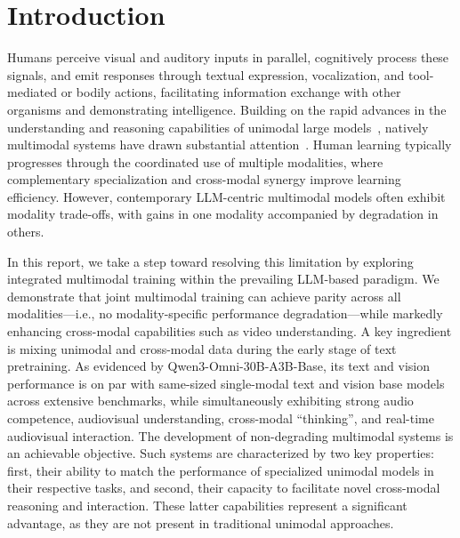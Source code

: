\section{Introduction}
\label{sec:intro}

Humans perceive visual and auditory inputs in parallel, cognitively process these signals, and emit responses through textual expression, vocalization, and tool-mediated or bodily actions, facilitating information exchange with other organisms and demonstrating intelligence. Building on the rapid advances in the understanding and reasoning capabilities of unimodal large models~\citep{gpt3,gpt4,gemini,claude,claude2,claude3,qwen,qwen2,qwen3,llama2,llama3,blip2,llava,minigpt-4,qwenvl,qwen2.5vl, qwenaudio, qwen2-audio}, natively multimodal systems have drawn substantial attention~\citep{gpt4o,gemini2.5,qwen2.5omni}. Human learning typically progresses through the coordinated use of multiple modalities, where complementary specialization and cross-modal synergy improve learning efficiency. However, contemporary LLM-centric multimodal models often exhibit modality trade-offs, with gains in one modality accompanied by degradation in others.


In this report, we take a step toward resolving this limitation by exploring integrated multimodal training within the prevailing LLM-based paradigm. We demonstrate that joint multimodal training can achieve parity across all modalities—i.e., no modality-specific performance degradation—while markedly enhancing cross-modal capabilities such as video understanding. A key ingredient is mixing unimodal and cross-modal data during the early stage of text pretraining. As evidenced by Qwen3-Omni-30B-A3B-Base, its text and vision performance is on par with same-sized single-modal text and vision base models across extensive benchmarks, while simultaneously exhibiting strong audio competence, audiovisual understanding, cross-modal ``thinking'', and real-time audiovisual interaction. The development of non-degrading multimodal systems is an achievable objective. Such systems are characterized by two key properties: first, their ability to match the performance of specialized unimodal models in their respective tasks, and second, their capacity to facilitate novel cross-modal reasoning and interaction. These latter capabilities represent a significant advantage, as they are not present in traditional unimodal approaches.



